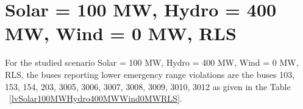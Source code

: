 \documentclass[10pt]{report}
\begin{document}
\section{Solar = 100 MW, Hydro = 400 MW, Wind = 0 MW, RLS}
For the studied scenario Solar = 100 MW, Hydro = 400 MW, Wind = 0 MW, RLS, the buses reporting lower emergency range violations are the buses 103, 153, 154, 203, 3005, 3006, 3007, 3008, 3009, 3010, 3012 as given in the Table ~\ref{lvSolar100MWHydro400MWWind0MWRLS}.
\begin{table}[H]
\caption{Contingencies reporting bus voltages lower than emergency voltage of 1.1 PU for scenario Solar = 100 MW, Hydro = 400 MW, Wind = 0 MW, RLS}
\label{lvSolar100MWHydro400MWWind0MWRLS}
\centering
{}
\end{table}
\end{document}
